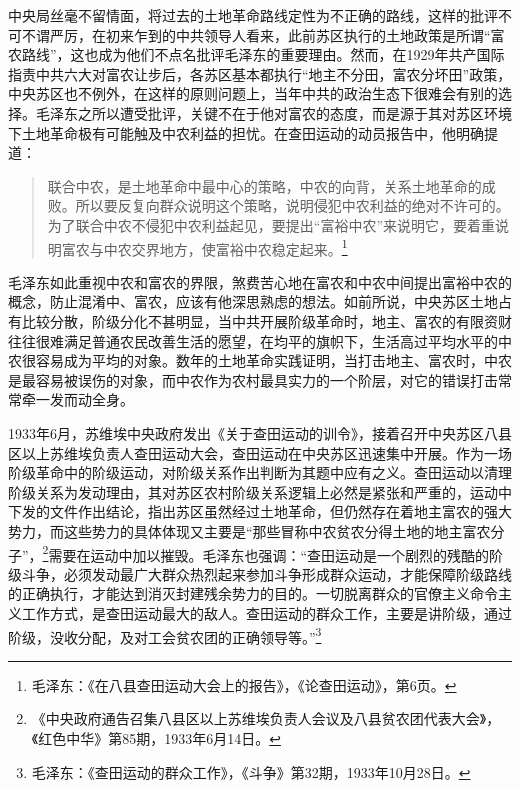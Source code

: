 中央局丝毫不留情面，将过去的土地革命路线定性为不正确的路线，这样的批评不可不谓严厉，在初来乍到的中共领导人看来，此前苏区执行的土地政策是所谓“富农路线”，这也成为他们不点名批评毛泽东的重要理由。然而，在1929年共产国际指责中共六大对富农让步后，各苏区基本都执行“地主不分田，富农分坏田”政策，中央苏区也不例外，在这样的原则问题上，当年中共的政治生态下很难会有别的选择。毛泽东之所以遭受批评，关键不在于他对富农的态度，而是源于其对苏区环境下土地革命极有可能触及中农利益的担忧。在查田运动的动员报告中，他明确提道：

\begin{quote}

联合中农，是土地革命中最中心的策略，中农的向背，关系土地革命的成败。所以要反复向群众说明这个策略，说明侵犯中农利益的绝对不许可的。为了联合中农不侵犯中农利益起见，要提出“富裕中农”来说明它，要着重说明富农与中农交界地方，使富裕中农稳定起来。\footnote{毛泽东：《在八县查田运动大会上的报告》，《论查田运动》，第6页。}
\end{quote}


毛泽东如此重视中农和富农的界限，煞费苦心地在富农和中农中间提出富裕中农的概念，防止混淆中、富农，应该有他深思熟虑的想法。如前所说，中央苏区土地占有比较分散，阶级分化不甚明显，当中共开展阶级革命时，地主、富农的有限资财往往很难满足普通农民改善生活的愿望，在均平的旗帜下，生活高过平均水平的中农很容易成为平均的对象。数年的土地革命实践证明，当打击地主、富农时，中农是最容易被误伤的对象，而中农作为农村最具实力的一个阶层，对它的错误打击常常牵一发而动全身。


1933年6月，苏维埃中央政府发出《关于查田运动的训令》，接着召开中央苏区八县区以上苏维埃负责人查田运动大会，查田运动在中央苏区迅速集中开展。作为一场阶级革命中的阶级运动，对阶级关系作出判断为其题中应有之义。查田运动以清理阶级关系为发动理由，其对苏区农村阶级关系逻辑上必然是紧张和严重的，运动中下发的文件作出结论，指出苏区虽然经过土地革命，但仍然存在着地主富农的强大势力，而这些势力的具体体现又主要是“那些冒称中农贫农分得土地的地主富农分子”，\footnote{《中央政府通告召集八县区以上苏维埃负责人会议及八县贫农团代表大会》，《红色中华》第85期，1933年6月14日。}需要在运动中加以摧毁。毛泽东也强调：“查田运动是一个剧烈的残酷的阶级斗争，必须发动最广大群众热烈起来参加斗争形成群众运动，才能保障阶级路线的正确执行，才能达到消灭封建残余势力的目的。一切脱离群众的官僚主义命令主义工作方式，是查田运动最大的敌人。查田运动的群众工作，主要是讲阶级，通过阶级，没收分配，及对工会贫农团的正确领导等。”\footnote{毛泽东：《查田运动的群众工作》，《斗争》第32期，1933年10月28日。}


